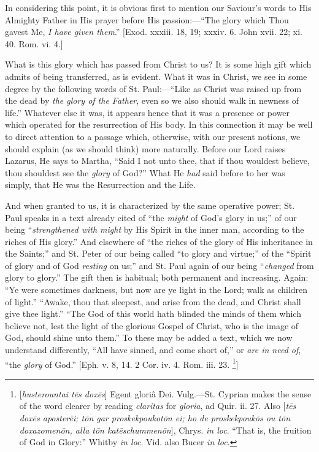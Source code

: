 In considering this point, it is obvious first to mention our
Saviour's words to His Almighty Father in His prayer before His
passion:—``The glory which Thou gavest Me, \emph{I have given them}.''
[Exod. xxxiii. 18, 19; xxxiv. 6. John xvii. 22; xi. 40. Rom. vi. 4.]

What is this glory which has passed from Christ to us? It is some
high gift which admits of being transferred, as is evident. What it
was in Christ, we see in some degree by the following words of St.
Paul:—``Like as Christ was raised up from the dead by \emph{the
glory of the Father}, even so we also should walk in newness of
life.'' Whatever else it was, it appears hence that it was a
presence or power which operated for the resurrection of His body. In
this connection it may be well to direct attention to a passage which,
otherwise, with our present notions, we should explain (as we should
think) more naturally. Before our Lord raises Lazarus, He says to
Martha, ``Said I not unto thee, that if thou wouldest believe,
thou shouldest see the \emph{glory} of God?'' What He \emph{had}
said before to her was simply, that He was the Resurrection and the
Life.

And when granted to us, it is characterized by the same operative
power; St. Paul speaks in a text already cited of ``the \emph{might}
of God's glory in us;'' of our being ``\emph{strengthened with
might} by His Spirit in the inner man, according to the riches of
His glory.'' And elsewhere of ``the riches of the glory of His
inheritance in the Saints;'' and St. Peter of our being called
``to glory and virtue;'' of the ``Spirit of glory and of
God \emph{resting} on us;'' and St. Paul again of our being ``\emph{changed}
from glory to glory.'' The gift then is habitual; both permanent
and increasing. Again: ``Ye were sometimes darkness, but now are
ye light in the Lord; walk as children of light.'' ``Awake,
thou that sleepest, and arise from the dead, and Christ shall give
thee light.'' ``The God of this world hath blinded the minds
of them which believe not, lest the light of the glorious Gospel of
Christ, who is the image of God, should shine unto them.'' To
these may be added a text, which we now understand differently,
``All have sinned, and come short of,'' or \emph{are in need of},
``the \emph{glory} of God.'' [Eph. v. 8, 14. 2 Cor. iv. 4.
Rom. iii. 23. \footnote{[\emph{husterountai
t\={e}s dox\={e}s}] Egent gloriâ Dei.
Vulg.—St. Cyprian makes the sense of the word clearer by reading \emph{claritas}
for \emph{gloria}, ad Quir. ii. 27. Also [\emph{t\={e}s dox\={e}s
aposter\={e}i; t\={o}n gar proskekpoukot\={o}n ei; ho de
proskekpouk\={o}s ou t\={o}n doxazomen\={o}n, alla t\={o}n
kat\={e}schummen\={o}n}], Chrys. \emph{in loc}. ``That is, the fruition of God in
Glory:'' Whitby \emph{in loc}. Vid. also Bucer \emph{in loc}.}]


